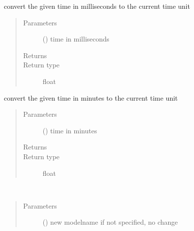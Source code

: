 \documentclass[letterpaper,10pt,english]{sphinxmanual}
\begin{document}
\begin{fulllineitems}
\begin{fulllineitems}
\label{\detokenize{Reference:salabim.Environment.milliseconds}}
convert the given time in milliseconds to the current time unit
\begin{quote}\begin{description}
\item[{Parameters}] \leavevmode
{} () \textendash{} time in milliseconds

\item[{Returns}] \leavevmode
{}

\item[{Return type}] \leavevmode
float

\end{description}\end{quote}

\end{fulllineitems}


\begin{fulllineitems}
\label{\detokenize{Reference:salabim.Environment.minutes}}
convert the given time in minutes to the current time unit
\begin{quote}\begin{description}
\item[{Parameters}] \leavevmode
{} () \textendash{} time in minutes

\item[{Returns}] \leavevmode
{}

\item[{Return type}] \leavevmode
float

\end{description}\end{quote}

\end{fulllineitems}


\begin{fulllineitems}
\label{\detokenize{Reference:salabim.Environment.modelname}}~\begin{quote}\begin{description}
\item[{Parameters}] \leavevmode
{} () \textendash{} new modelname 
if not specified, no change


\end{description}
\end{quote}
\end{fulllineitems}
\end{fulllineitems}
\end{document}
